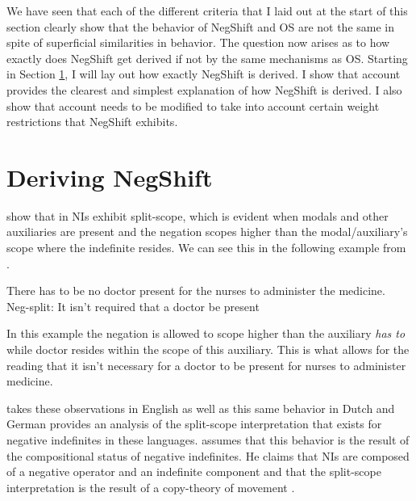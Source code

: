 \documentclass[12pt, letterpaper]{article}
\begin{document}
We have seen that each of the different criteria that I laid out at the start of this section clearly show that the behavior of NegShift and OS are not the same in spite of superficial similarities in behavior. The question now arises as to how exactly does NegShift get derived if not by the same mechanisms as OS. Starting in Section \ref{sec:DERIVING}, I will lay out how exactly NegShift is derived. I show that  account provides the clearest and simplest explanation of how NegShift is derived. I also show that  account needs to be modified to take into account certain weight restrictions that NegShift exhibits.

\section{Deriving NegShift} \label{sec:DERIVING}

\citet{iatridouNegativeDPsAMovement2011} show that in NIs exhibit split-scope, which is evident when modals and other auxiliaries are present and the negation scopes higher than the modal/auxiliary's scope where the indefinite resides. We can see this in the following example from \citet{iatridouNegativeDPsAMovement2011}. 

\ea There has to be no doctor present for the nurses to administer the medicine.\\
Neg-split: It isn’t required that a doctor be present
\z 

In this example the negation is allowed to scope higher than the auxiliary \emph{has to} while doctor resides within the scope of this auxiliary. This is what allows for the reading that it isn't necessary for a doctor to be present for nurses to administer medicine. 

\citet{zeijlstraSyntacticallyComplexStatus2011} takes these observations in English as well as this same behavior in Dutch and German provides an analysis of the split-scope interpretation that exists for negative indefinites in these languages.  \citeauthor{zeijlstraSyntacticallyComplexStatus2011} assumes that this behavior is the result of the compositional status of negative indefinites. He claims that NIs are composed of a negative operator and an indefinite component and that the split-scope interpretation is the result of a copy-theory of movement \citep{chomskyMinimalistProgramLinguistic1993}. 
\end{document}
